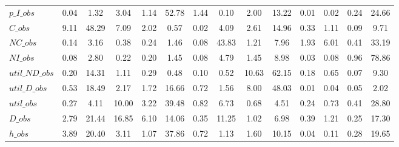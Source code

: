 \begin{center}
\begin{longtable}{lccccccccccccc}
$p\_I\_obs      $	 & 	            0.04	 & 	            1.32	 & 	            3.04	 & 	            1.14	 & 	           52.78	 & 	            1.44	 & 	            0.10	 & 	            2.00	 & 	           13.22	 & 	            0.01	 & 	            0.02	 & 	            0.24	 & 	           24.66 \\ 
$C\_obs         $	 & 	            9.11	 & 	           48.29	 & 	            7.09	 & 	            2.02	 & 	            0.57	 & 	            0.02	 & 	            4.09	 & 	            2.61	 & 	           14.96	 & 	            0.33	 & 	            1.11	 & 	            0.09	 & 	            9.71 \\ 
$NC\_obs        $	 & 	            0.14	 & 	            3.16	 & 	            0.38	 & 	            0.24	 & 	            1.46	 & 	            0.08	 & 	           43.83	 & 	            1.21	 & 	            7.96	 & 	            1.93	 & 	            6.01	 & 	            0.41	 & 	           33.19 \\ 
$NI\_obs        $	 & 	            0.08	 & 	            2.80	 & 	            0.22	 & 	            0.20	 & 	            1.45	 & 	            0.08	 & 	            4.79	 & 	            1.45	 & 	            8.98	 & 	            0.03	 & 	            0.08	 & 	            0.96	 & 	           78.86 \\ 
$util\_ND\_obs  $	 & 	            0.20	 & 	           14.31	 & 	            1.11	 & 	            0.29	 & 	            0.48	 & 	            0.10	 & 	            0.52	 & 	           10.63	 & 	           62.15	 & 	            0.18	 & 	            0.65	 & 	            0.07	 & 	            9.30 \\ 
$util\_D\_obs   $	 & 	            0.53	 & 	           18.49	 & 	            2.17	 & 	            1.72	 & 	           16.66	 & 	            0.72	 & 	            1.56	 & 	            8.00	 & 	           48.03	 & 	            0.01	 & 	            0.04	 & 	            0.05	 & 	            2.02 \\ 
$util\_obs      $	 & 	            0.27	 & 	            4.11	 & 	           10.00	 & 	            3.22	 & 	           39.48	 & 	            0.82	 & 	            6.73	 & 	            0.68	 & 	            4.51	 & 	            0.24	 & 	            0.73	 & 	            0.41	 & 	           28.80 \\ 
$D\_obs         $	 & 	            2.79	 & 	           21.44	 & 	           16.85	 & 	            6.10	 & 	           14.06	 & 	            0.35	 & 	           11.25	 & 	            1.02	 & 	            6.98	 & 	            0.39	 & 	            1.21	 & 	            0.25	 & 	           17.30 \\ 
$h\_obs         $	 & 	            3.89	 & 	           20.40	 & 	            3.11	 & 	            1.07	 & 	           37.86	 & 	            0.72	 & 	            1.13	 & 	            1.60	 & 	           10.15	 & 	            0.04	 & 	            0.11	 & 	            0.28	 & 	           19.65 \\ 
\end{longtable}
 \end{center}
